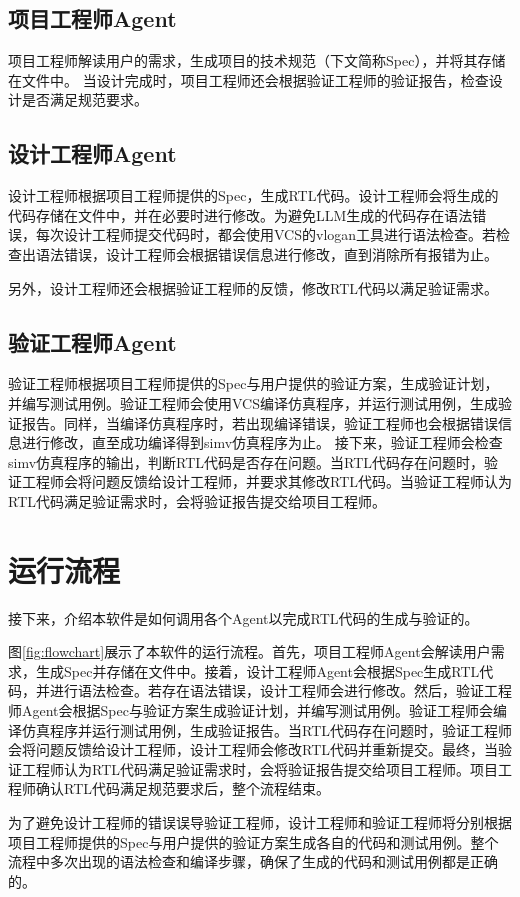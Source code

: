 \documentclass[UTF8]{ctexart}
\begin{document}
\subsection{项目工程师Agent}
项目工程师解读用户的需求，生成项目的技术规范（下文简称Spec），并将其存储在文件中。
当设计完成时，项目工程师还会根据验证工程师的验证报告，检查设计是否满足规范要求。


\subsection{设计工程师Agent}
设计工程师根据项目工程师提供的Spec，生成RTL代码。设计工程师会将生成的代码存储在文件中，并在必要时进行修改。为避免LLM生成的代码存在语法错误，每次设计工程师提交代码时，都会使用VCS的vlogan工具进行语法检查。若检查出语法错误，设计工程师会根据错误信息进行修改，直到消除所有报错为止。

另外，设计工程师还会根据验证工程师的反馈，修改RTL代码以满足验证需求。

\subsection{验证工程师Agent}
验证工程师根据项目工程师提供的Spec与用户提供的验证方案，生成验证计划，并编写测试用例。验证工程师会使用VCS编译仿真程序，并运行测试用例，生成验证报告。同样，当编译仿真程序时，若出现编译错误，验证工程师也会根据错误信息进行修改，直至成功编译得到simv仿真程序为止。
接下来，验证工程师会检查simv仿真程序的输出，判断RTL代码是否存在问题。当RTL代码存在问题时，验证工程师会将问题反馈给设计工程师，并要求其修改RTL代码。当验证工程师认为RTL代码满足验证需求时，会将验证报告提交给项目工程师。


\section{运行流程}
接下来，介绍本软件是如何调用各个Agent以完成RTL代码的生成与验证的。

图\ref{fig:flowchart}展示了本软件的运行流程。首先，项目工程师Agent会解读用户需求，生成Spec并存储在文件中。接着，设计工程师Agent会根据Spec生成RTL代码，并进行语法检查。若存在语法错误，设计工程师会进行修改。然后，验证工程师Agent会根据Spec与验证方案生成验证计划，并编写测试用例。验证工程师会编译仿真程序并运行测试用例，生成验证报告。当RTL代码存在问题时，验证工程师会将问题反馈给设计工程师，设计工程师会修改RTL代码并重新提交。最终，当验证工程师认为RTL代码满足验证需求时，会将验证报告提交给项目工程师。项目工程师确认RTL代码满足规范要求后，整个流程结束。

为了避免设计工程师的错误误导验证工程师，设计工程师和验证工程师将分别根据项目工程师提供的Spec与用户提供的验证方案生成各自的代码和测试用例。整个流程中多次出现的语法检查和编译步骤，确保了生成的代码和测试用例都是正确的。
\end{document}
